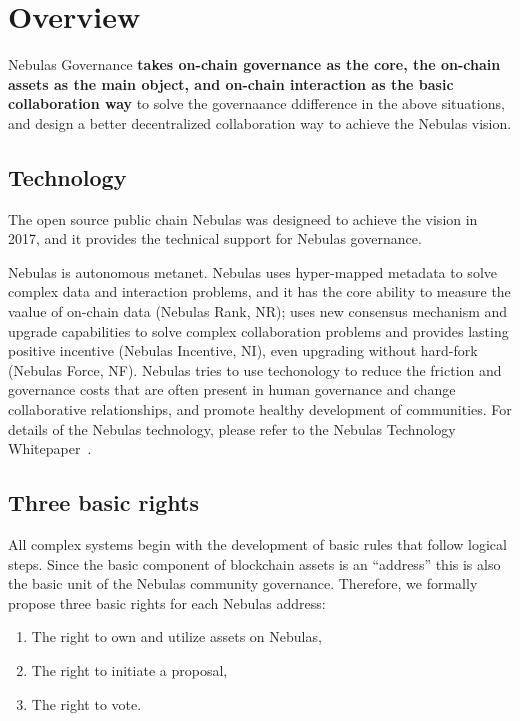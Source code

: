 \section{Overview}

Nebulas Governance\textbf{ takes on-chain governance as the core, the on-chain assets as the main object, and on-chain interaction as the basic collaboration way} to solve the governaance ddifference in the above situations, and design a better decentralized collaboration way to achieve the Nebulas vision.

\subsection{Technology}

The open source public chain Nebulas was designeed to achieve the vision in 2017, and it provides the technical support for Nebulas governance.

Nebulas is autonomous metanet. Nebulas uses hyper-mapped metadata to solve complex data and interaction problems, and it has the core ability to measure the vaalue of on-chain data (Nebulas Rank, NR); uses new consensus mechanism and upgrade capabilities to solve complex collaboration problems and provides lasting positive incentive (Nebulas Incentive, NI), even upgrading without hard-fork (Nebulas Force, NF). Nebulas tries to use techonology to reduce the friction and governance costs that are often present in human governance and change collaborative relationships, and promote healthy development of communities. For details of the Nebulas technology, please refer to the Nebulas Technology Whitepaper~\cite{TechWhitepaper}.

\subsection{Three basic rights}
\label{rights}

All complex systems begin with the development of basic rules that follow logical steps. Since the basic component of blockchain assets is an “address” this is also the basic unit of the Nebulas community governance. Therefore, we formally propose three basic rights for each Nebulas address:

\begin{enumerate}
	\item The right to own and utilize assets on Nebulas,
	\item The right to initiate a proposal,
	\item The right to vote.
\end{enumerate}

